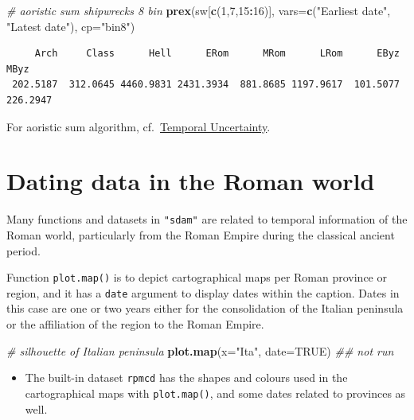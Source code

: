 \documentclass[a4paper,11pt]{memoir}
\newenvironment{Shaded}{\begin{snugshade}}{\end{snugshade}}
\newcommand{\CommentTok}[1]{\textcolor[rgb]{0.56,0.35,0.01}{\textit{#1}}}
\newcommand{\DataTypeTok}[1]{\textcolor[rgb]{0.13,0.29,0.53}{#1}}
\newcommand{\DecValTok}[1]{\textcolor[rgb]{0.00,0.00,0.81}{#1}}
\newcommand{\KeywordTok}[1]{\textcolor[rgb]{0.13,0.29,0.53}{\textbf{#1}}}
\newcommand{\NormalTok}[1]{#1}
\newcommand{\OperatorTok}[1]{\textcolor[rgb]{0.81,0.36,0.00}{\textbf{#1}}}
\newcommand{\OtherTok}[1]{\textcolor[rgb]{0.56,0.35,0.01}{#1}}
\newcommand{\StringTok}[1]{\textcolor[rgb]{0.31,0.60,0.02}{#1}}
\providecommand{\tightlist}{%
  \setlength{\itemsep}{0pt}\setlength{\parskip}{0pt}}
\begin{document}
\begin{Shaded}
\begin{Highlighting}[]
\CommentTok{# aoristic sum shipwrecks 8 bin}
\KeywordTok{prex}\NormalTok{(sw[}\KeywordTok{c}\NormalTok{(}\DecValTok{1}\NormalTok{,}\DecValTok{7}\NormalTok{,}\DecValTok{15}\OperatorTok{:}\DecValTok{16}\NormalTok{)], }\DataTypeTok{vars=}\KeywordTok{c}\NormalTok{(}\StringTok{"Earliest date"}\NormalTok{, }\StringTok{"Latest date"}\NormalTok{), }\DataTypeTok{cp=}\StringTok{"bin8"}\NormalTok{)}
\end{Highlighting}
\end{Shaded}

\begin{verbatim}
     Arch     Class      Hell      ERom      MRom      LRom      EByz      MByz 
 202.5187  312.0645 4460.9831 2431.3934  881.8685 1197.9617  101.5077  226.2947 
\end{verbatim}

For aoristic sum algorithm,
cf.~\href{https://mplex.github.io/cedhar/Uncertainty.html}{Temporal
Uncertainty}.

\hypertarget{dating-data-in-the-roman-world}{%
\section{Dating data in the Roman
world}\label{dating-data-in-the-roman-world}}

Many functions and datasets in \texttt{"sdam"} are related to temporal
information of the Roman world, particularly from the Roman Empire
during the classical ancient period.

Function \texttt{plot.map()} is to depict cartographical maps per Roman
province or region, and it has a
\texttt{\textquotesingle{}date\textquotesingle{}} argument to display
dates within the caption. Dates in this case are one or two years either
for the consolidation of the Italian peninsula or the affiliation of the
region to the Roman Empire.

\begin{Shaded}
\begin{Highlighting}[]
\CommentTok{# silhouette of Italian peninsula}
\KeywordTok{plot.map}\NormalTok{(}\DataTypeTok{x=}\StringTok{"Ita"}\NormalTok{, }\DataTypeTok{date=}\OtherTok{TRUE}\NormalTok{)}
\CommentTok{## not run}
\end{Highlighting}
\end{Shaded}

\begin{itemize}
\tightlist
\item
  The built-in dataset \texttt{rpmcd} has the shapes and colours used in
  the cartographical maps with \texttt{plot.map()}, and some dates
  related to provinces as well.
\end{itemize}
\end{document}

